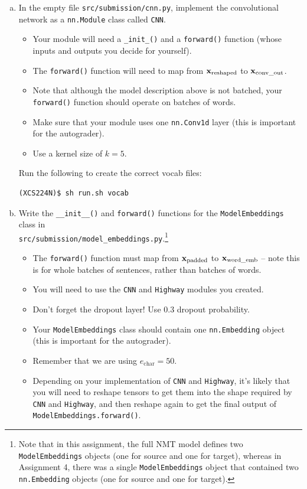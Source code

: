 \begin{enumerate}[(a)]
    \item \label{qn:cnn}
    In the empty file \texttt{src/submission/cnn.py}, implement the convolutional network as a \texttt{nn.Module} class called \texttt{CNN}.
    \begin{itemize}
        \item Your module will need a \texttt{\_init\_()} and a \texttt{forward()} function (whose inputs and outputs you decide for yourself).
        \item The \texttt{forward()} function will need to map from $\mathbf{x}_\text{reshaped}$ to $\mathbf{x}_\text{conv\_out}$.
        \item Note that although the model description above is not batched, your \texttt{forward()} function should operate on batches of words.
        \item Make sure that your module uses one \texttt{nn.Conv1d} layer (this is important for the autograder).
        \item Use a kernel size of $k=5$.
    \end{itemize}

Run the following to create the correct vocab files:
\begin{lstlisting}
(XCS224N)$ sh run.sh vocab
\end{lstlisting}

    \item {} Write the \texttt{\_\_init\_\_()} and \texttt{forward()} functions for the \texttt{ModelEmbeddings} class in \\
    \texttt{src/submission/model\_embeddings.py}.\footnote{Note that in this assignment, the full NMT model defines two \texttt{ModelEmbeddings} objects (one for source and one for target), whereas in Assignment 4, there was a single \texttt{ModelEmbeddings} object that contained two \texttt{nn.Embedding} objects (one for source and one for target).} 
    \begin{itemize}
        \item The \texttt{forward()} function must map from $\mathbf{x}_\text{padded}$ to $\mathbf{x}_\text{word\_emb}$ -- note this is for whole batches of sentences, rather than batches of words.
        \item You will need to use the \texttt{CNN} and \texttt{Highway} modules you created.
        \item Don't forget the dropout layer! Use 0.3 dropout probability.
        \item Your \texttt{ModelEmbeddings} class should contain one \texttt{nn.Embedding} object (this is important for the autograder).
        \item Remember that we are using $e_\text{char}=50$.
        \item Depending on your implementation of \texttt{CNN} and \texttt{Highway}, it's likely that you will need to reshape tensors to get them into the shape required by \texttt{CNN} and \texttt{Highway}, and then reshape again to get the final output of \texttt{ModelEmbeddings.forward()}.
    \end{itemize}
    

\end{enumerate}
